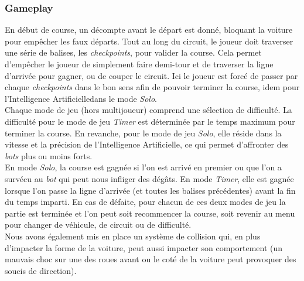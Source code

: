 \documentclass[a4paper,12pt]{article}
\newcommand{\AI}{Intelligence Artificielle}
\begin{document}
            \subsubsection{Gameplay}
                En début de course, un décompte avant le départ est donné, bloquant la voiture pour
                empêcher les faux départs. Tout au long du circuit, le joueur doit traverser une série de 
                balises, les \textit{checkpoints}, pour valider la course. Cela permet d'empêcher le 
                joueur de simplement faire demi-tour et de traverser la ligne d'arrivée pour gagner, ou
                de couper le circuit. Ici le joueur est forcé de passer par chaque \textit{checkpoints}
                dans le bon sens afin de pouvoir terminer la course,
                idem pour l'\AI\;dans le mode \textsl{Solo}.\\
                Chaque mode de jeu (hors multijoueur) comprend une sélection de difficulté.
                La difficulté pour le mode de jeu \textsl{Timer} est déterminée par le temps maximum pour 
                terminer la course. En revanche, pour le mode de jeu \textsl{Solo}, 
                elle réside dans la vitesse et la précision de l'\AI, ce qui permet d'affronter des 
                \textit{bots} plus ou moins forts. \\
                En mode \textsl{Solo}, la course est gagnée si l'on est arrivé en premier ou que l'on a 
                survécu au \textit{bot} qui peut nous infliger des dégâts. En mode \textsl{Timer}, elle 
                est gagnée lorsque l'on passe la ligne d'arrivée (et toutes les balises précédentes) avant
                la fin du temps imparti. En cas de défaite, pour chacun de ces deux modes de jeu la partie
                est terminée et l'on peut soit recommencer la course, soit revenir au menu pour changer de
                véhicule, de circuit ou de difficulté.\\
                Nous avons également mis en place un système de collision qui, en plus d'impacter la forme de 
                la voiture, peut aussi impacter son comportement (un mauvais choc sur une des roues avant ou 
                le coté de la voiture peut provoquer des soucis de direction).
\end{document}

